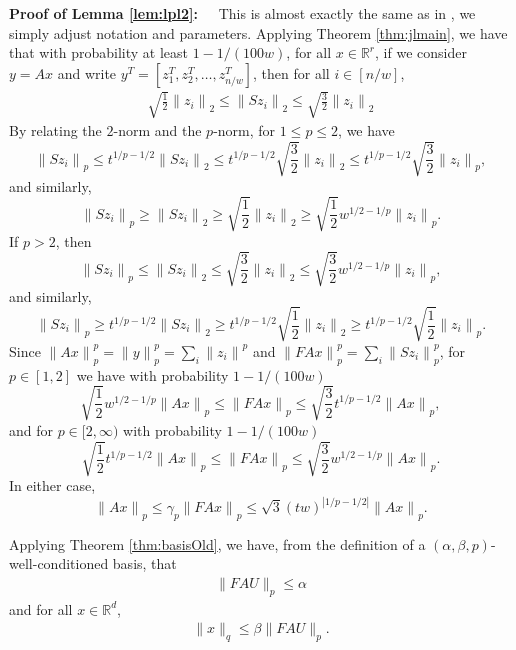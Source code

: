 \documentclass{sig-alternate}
\newcommand{\norm}[1]{{\| #1 \|}}
\def\FullBox{\hbox{\vrule width 8pt height 8pt depth 0pt}}
\def\qed{\ifmmode\qquad\FullBox\else{\unskip\nobreak\hfil
\penalty50\hskip1em\null\nobreak\hfil\FullBox
\parfillskip=0pt\finalhyphendemerits=0\endgraf}\fi}
\newenvironment{proofof}[1]{\begin{trivlist} \item {\bf Proof
#1:~~}}
  {\qed\end{trivlist}}
\begin{document}
\begin{proofof}{of Lemma \ref{lem:lpl2}}
This is almost exactly the same as in \cite{CDMMMW}, we simply adjust notation and parameters. 
Applying Theorem \ref{thm:jlmain}, we have that
with probability at least $1-1/(100w)$, for all $x \in \mathbb{R}^r$, if we consider $y = Ax$ and
write $y^T = [z_1^T, z_2^T, \ldots, z_{n/w}^T]$, then for all $i \in [n/w]$,  
\begin{eqnarray*}
\sqrt{\textstyle\frac12}\norm{z_i}_2\le\norm{Sz_i}_2\le
\sqrt{\textstyle\frac32}\norm{z_i}_2
\end{eqnarray*}
By relating the $2$-norm and the $p$-norm, for $1 \leq p \leq 2$, we have
$$\norm{Sz_i}_p
	\le t^{1/p-1/2}\norm{Sz_i}_2
	\le t^{1/p-1/2} \sqrt{\textstyle\frac32} \norm{z_i}_2
	\le t^{1/p-1/2} \sqrt{\textstyle\frac32} \norm{z_i}_p,$$
and similarly,
$$\norm{Sz_i}_p
	\ge \norm{Sz_i}_2
	\ge \sqrt{\textstyle\frac12}\norm{z_i}_2
	\ge \sqrt{\textstyle\frac12} w^{1/2-1/p}\norm{z_i}_p.
$$
If $p > 2$, then 
$$
\norm{Sz_i}_p
	\le \norm{Sz_i}_2
	\le \sqrt{\textstyle\frac32} \norm{z_i}_2
	\le \sqrt{\textstyle\frac32} w^{1/2 - 1/p} \norm{z_i}_p,$$
and similarly,
$$
\norm{Sz_i}_p
	\ge t^{1/p-1/2}\norm{Sz_i}_2
	\ge t^{1/p-1/2} \sqrt{\textstyle\frac12} \norm{z_i}_2
 	\ge t^{1/p-1/2} \sqrt{\textstyle\frac12}  \norm{z_i}_p.
$$
Since $\norm{Ax}_p^p = \norm{y}_p^p = \sum_i \norm{z_i}^p$
and $\norm{FAx}_p^p = \sum_i \norm{Sz_i}_p^p$,
for $p\in [1,2]$ we have with probability $1-1/(100w)$
\[
\sqrt{\textstyle\frac12} w^{1/2-1/p}\norm{Ax}_p
	\le \norm{FAx}_p \le \sqrt{\textstyle\frac32} t^{1/p-1/2} \norm{Ax}_p,
\]
and for $p\in [2,\infty)$ with probability $1-1/(100w)$
\[
\sqrt{\textstyle\frac12} t^{1/p-1/2} \norm{Ax}_p
	\le \norm{FAx}_p \le \sqrt{\textstyle\frac32} w^{1/2 - 1/p} \norm{Ax}_p.
\]
In either case,
\begin{equation}\label{eqn:first}
\norm{Ax}_p \le \gamma_p \norm{FAx}_p \le \sqrt{3} (tw)^{|1/p-1/2|}\norm{Ax}_p.
\end{equation}



Applying Theorem \ref{thm:basisOld}, we have, from the definition
of a $(\alpha,\beta,p)$-well-conditioned basis, that 
\begin{eqnarray}\label{eqn:second}
\|FA U \|_p \leq \alpha 
\end{eqnarray}
and for all $x \in \mathbb{R}^d$,
\begin{eqnarray}\label{eqn:third}
\|x\|_q \leq \beta \|FAU\|_p.
\end{eqnarray}


\end{proofof}
\end{document}
